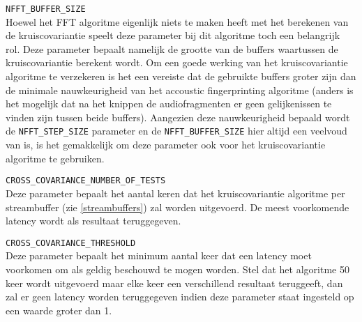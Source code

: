 \begin{description}	
	\item\texttt{NFFT\_BUFFER\_SIZE} \hfill \\
	Hoewel het FFT algoritme eigenlijk niets te maken heeft met het berekenen van de kruiscovariantie speelt deze parameter bij dit algoritme toch een belangrijk rol. Deze parameter bepaalt namelijk de grootte van de buffers waartussen de kruiscovariantie berekent wordt. Om een goede werking van het kruiscovariantie algoritme te verzekeren is het een vereiste dat de gebruikte buffers groter zijn dan de minimale nauwkeurigheid van het accoustic fingerprinting algoritme (anders is het mogelijk dat na het knippen de audiofragmenten er geen gelijkenissen te vinden zijn tussen beide buffers). Aangezien deze nauwkeurigheid bepaald wordt de \texttt{NFFT\_STEP\_SIZE} parameter en de \texttt{NFFT\_BUFFER\_SIZE} hier altijd een veelvoud van is, is het gemakkelijk om deze parameter ook voor het kruiscovariantie algoritme te gebruiken.
	
	\item\texttt{CROSS\_COVARIANCE\_NUMBER\_OF\_TESTS} \hfill \\
	Deze parameter bepaalt het aantal keren dat het kruiscovariantie algoritme per streambuffer (zie \ref{streambuffers}) zal worden uitgevoerd. De meest voorkomende latency wordt als resultaat teruggegeven.
	
	\item\texttt{CROSS\_COVARIANCE\_THRESHOLD} \hfill \\
	Deze parameter bepaalt het minimum aantal keer dat een latency moet voorkomen om als geldig beschouwd te mogen worden.	Stel dat het algoritme 50 keer wordt uitgevoerd maar elke keer een verschillend resultaat teruggeeft, dan zal er geen latency worden teruggegeven indien deze parameter staat ingesteld op een waarde groter dan 1.
	
\end{description}

